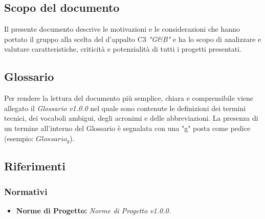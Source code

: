 	\subsection{Scopo del documento}
	Il presente documento descrive le motivazioni e le considerazioni che hanno portato il gruppo alla scelta del  d'appalto C3 \emph{"G\&B"} e ha lo scopo di analizzare e valutare caratteristiche, criticità e potenzialità di tutti i progetti presentati.
	\subsection{Glossario}
	Per rendere la lettura del documento più semplice, chiara e comprensibile viene allegato il \emph{Glossario v1.0.0} nel quale sono contenute le definizioni dei termini tecnici, dei vocaboli ambigui, degli acronimi e delle abbreviazioni. La presenza di un termine all'interno del Glossario è segnalata con una "g" posta come pedice (esempio: $Glossario_{g}$).  
	\subsection{Riferimenti}
		\subsubsection{Normativi}
		\begin{itemize}
			\item \textbf{Norme di Progetto:} \emph{Norme di Progetto v1.0.0.}
		\end{itemize}
